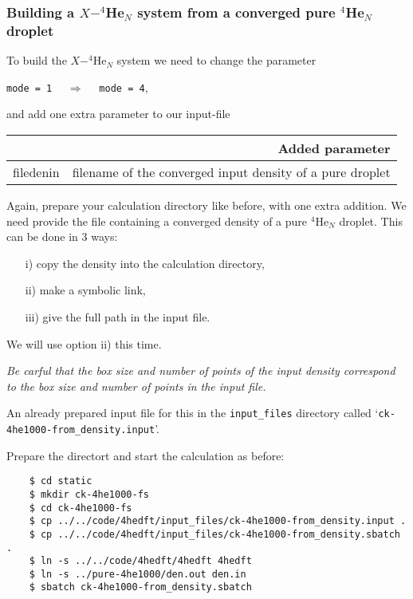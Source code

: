 \documentclass[10pt,a4paper]{article}
\begin{document}
	\subsubsection{Building a $X-^4$He$_{N}$ system from a converged pure $^4$He$_{N}$ droplet}
	To build the $X-^4$He$_N$ system we need to change the parameter
	\begin{center}
		\verb|mode = 1|	$\quad\Longrightarrow\quad$	\verb|mode = 4|,
	\end{center}
	and add one extra parameter to our input-file
	\begin{center}
		\begin{tabular}{l|p{9.75cm}}
			\multicolumn{2}{r}{\textbf{Added parameter}} \\
			\hline\hline
			filedenin 			& filename of the converged input density of a pure droplet \\
		\end{tabular}
	\end{center}
	\vspace{0.1cm}
	Again, prepare your calculation directory like before, with one extra addition. We need provide the file containing a converged density of a pure $^4$He$_N$ droplet. This can be done in 3 ways:
	\begin{itemize}
		\item[i)] copy the density into the calculation directory,
		\item[ii)] make a symbolic link,
		\item[iii)] give the full path in the input file.
	\end{itemize}
	We will use option ii) this time.
	
	{\color{red}\emph{Be carful that the box size and number of points of the input density correspond to the box size and number of points in the input file.}}
	
	An already prepared input file for this in the \verb|input_files| directory called `\verb|ck-4he1000-from_density.input|'.
	
	Prepare the directort and start the calculation as before:
	\begin{verbatim}
	$ cd static
	$ mkdir ck-4he1000-fs
	$ cd ck-4he1000-fs
	$ cp ../../code/4hedft/input_files/ck-4he1000-from_density.input .
	$ cp ../../code/4hedft/input_files/ck-4he1000-from_density.sbatch .
	$ ln -s ../../code/4hedft/4hedft 4hedft
	$ ln -s ../pure-4he1000/den.out den.in
	$ sbatch ck-4he1000-from_density.sbatch
	\end{verbatim}	
	
\end{document}
